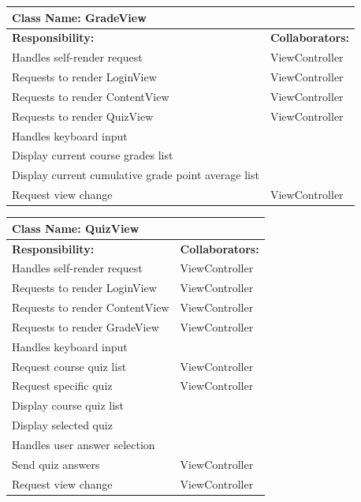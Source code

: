 \documentclass[]{article}
\begin{document}
\begin{enumerate}[a)]
  \begin{table}[ht]
    \centering
    \begin{tabular}{|p{9cm}|p{3cm}|}
    \hline
     \multicolumn{2}{|l|}{\textbf{Class Name:} GradeView} \\
    \hline
    \textbf{Responsibility:} & \textbf{Collaborators:} \\
    \hline
    Handles self-render request & ViewController \\
    \hline
    Requests to render LoginView & ViewController \\
    \hline
    Requests to render ContentView & ViewController \\
    \hline
    Requests to render QuizView & ViewController \\
    \hline
    Handles keyboard input & \\
    \hline
    Display current course grades list & \\
    \hline
    Display current cumulative grade point average list & \\
    \hline
    Request view change & ViewController \\
    \hline
    \end{tabular}
  \end{table}

  \begin{table}[ht]
    \centering
    \begin{tabular}{|p{9cm}|p{3cm}|}
    \hline
     \multicolumn{2}{|l|}{\textbf{Class Name:} QuizView} \\
    \hline
    \textbf{Responsibility:} & \textbf{Collaborators:} \\
    \hline
    Handles self-render request & ViewController \\
    \hline
    Requests to render LoginView & ViewController \\
    \hline
    Requests to render ContentView & ViewController \\
    \hline
    Requests to render GradeView & ViewController \\
    \hline
    Handles keyboard input & \\
    \hline
    Request course quiz list & ViewController \\
    \hline
    Request specific quiz & ViewController \\
    \hline
    Display course quiz list & \\
    \hline
    Display selected quiz & \\
    \hline
    Handles user answer selection & \\
    \hline
    Send quiz answers & ViewController \\
    \hline
    Request view change & ViewController \\
    \hline
    \end{tabular}
  \end{table}


\end{enumerate}
\end{document}
